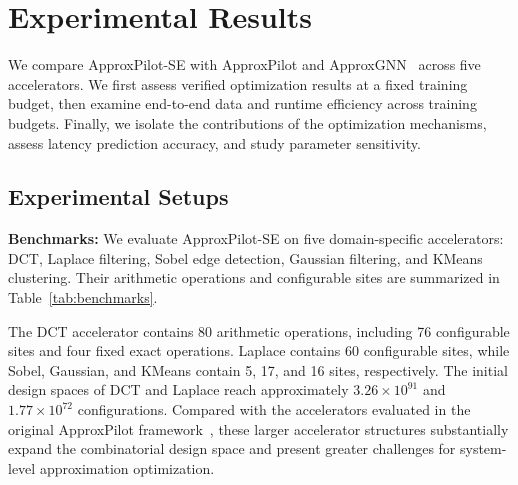
\section{Experimental Results}
\label{sec:experiments}

We compare ApproxPilot-SE with ApproxPilot and ApproxGNN~\cite{zhang2025approxpilot,vlcek2025approxgnn} across five accelerators. We first assess verified optimization results at a fixed training budget, then examine end-to-end data and runtime efficiency across training budgets. Finally, we isolate the contributions of the optimization mechanisms, assess latency prediction accuracy, and study parameter sensitivity.













\subsection{Experimental Setups}
\label{sec:setup}

\noindent\textbf{Benchmarks:}
We evaluate ApproxPilot-SE on five domain-specific accelerators: DCT, Laplace filtering, Sobel edge detection, Gaussian filtering, and KMeans clustering. Their arithmetic operations and configurable sites are summarized in Table~\ref{tab:benchmarks}.

The DCT accelerator contains 80 arithmetic operations, including 76 configurable sites and four fixed exact operations. Laplace contains 60 configurable sites, while Sobel, Gaussian, and KMeans contain 5, 17, and 16 sites, respectively. The initial design spaces of DCT and Laplace reach approximately $3.26\times10^{91}$ and $1.77\times10^{72}$ configurations. Compared with the accelerators evaluated in the original ApproxPilot framework~\cite{zhang2025approxpilot}, these larger accelerator structures substantially expand the combinatorial design space and present greater challenges for system-level approximation optimization.






